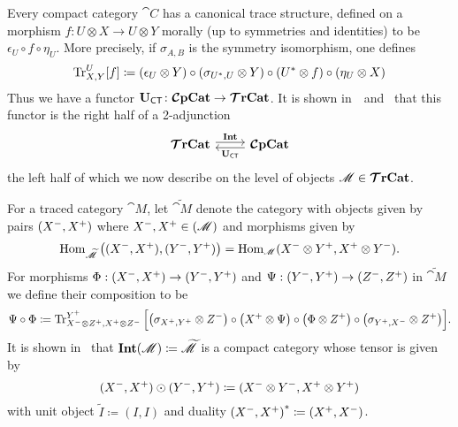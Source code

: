 \documentclass[11pt,oneside,article]{memoir}
\begin{document}
Every compact category $\cat{C}$ has a canonical trace structure, defined on a morphism $f\colon
U\otimes X\to U\otimes Y$ morally (up to symmetries and identities) to be $\epsilon_U\circ f\circ
\eta_U$. More precisely, if $\sigma_{A,B}$ is the symmetry isomorphism, one defines
\begin{equation*}
   \operatorname{Tr}^U_{X,Y}[f]\coloneqq(\epsilon_U\otimes Y)\circ (\sigma_{U^*,U}\otimes Y)\circ (U^*\otimes f)\circ (\eta_U\otimes X)
\end{equation*}
Thus we have a functor $\mathbf{U}_{\mathsf{CT}}\colon\bm{\mathcal{C}}\mathbf{pCat}\to\bm{\mathcal{T}}\mathbf{rCat}$. It is shown
in~\cite{JoyalStreetVerity}~and~\cite{HK} that this functor is the right half of a 2-adjunction
\begin{equation}
      \label{dia:traced_compact_adjunction}
   \begin{tikzcd}
      \TTrCat\arrow[r,shift left=.5ex, "\Int"]&\CCompCat\arrow[l,shift left=.5ex,"\UCT"]
   \end{tikzcd}
\end{equation}
the left half of which we now describe on the level of objects $\mathscr{M}\in\bm{\mathcal{T}}\mathbf{rCat}$.

For a traced category $\cat{M}$, let $\widetilde{\cat{M}}$ denote the category with objects given by
pairs $(X^-,X^+)$ where $X^-,X^+\in(\mathscr{M})$ and morphisms given by
\begin{equation*}
   \operatorname{Hom}_{\widetilde{\mathscr{M}}}\big((X^-,X^+),(Y^-,Y^+)\big)
      = \operatorname{Hom}_{\mathscr{M}}(X^-\otimes Y^+,X^+\otimes Y^-).
\end{equation*}
For morphisms $\Phi:(X^-,X^+)\to(Y^-,Y^+)$ and
$\Psi:(Y^-,Y^+)\to(Z^-,Z^+)$ in $\widetilde{\cat{M}}$ we define their composition
to be
\begin{equation*}
   \Psi\circ\Phi\coloneqq\operatorname{Tr}^{Y^+}_{X^-\otimes Z^+,X^+\otimes Z^-}\Big[\big(\sigma_{X^+,Y^+}\otimes Z^-\big)\circ\big(X^+\otimes\Psi\big)\circ\big(\Phi\otimes Z^+\big)\circ\big(\sigma_{Y^+,X^-}\otimes Z^+\big)\Big].
\end{equation*}
It is shown in~\cite{JoyalStreetVerity} that $\mathbf{Int}(\mathscr{M})\coloneqq\widetilde{\mathscr{M}}$ is a
compact category whose tensor is given by
\begin{equation*}
   (X^-,X^+)\odot(Y^-,Y^+)\coloneqq(X^-\otimes Y^-,X^+\otimes Y^+)
\end{equation*}
with unit object $\tilde I\coloneqq(I,I)$ and duality
${(X^-,X^+)}^*\coloneqq(X^+,X^-)$.
\end{document}
